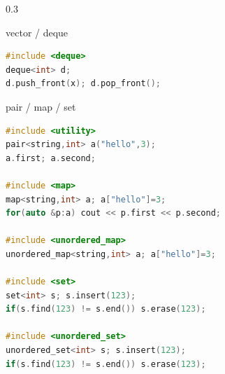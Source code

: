 \documentclass[final]{beamer}
\begin{document}
\begin{frame}[t,fragile]
\begin{columns}[t,totalwidth=0.9\paperwidth, colsep=0.015\paperwidth]
\begin{column}{0.3\paperwidth}
\begin{block}{vector / deque}
\begin{lstlisting}[language=C++]
#include <deque>
deque<int> d;
d.push_front(x); d.pop_front();
\end{lstlisting}
\end{block}

\begin{block}{pair / map / set}
\begin{lstlisting}[language=C++]
#include <utility>
pair<string,int> a("hello",3);
a.first; a.second;

#include <map>
map<string,int> a; a["hello"]=3;
for(auto &p:a) cout << p.first << p.second;

#include <unordered_map>
unordered_map<string,int> a; a["hello"]=3;

#include <set>
set<int> s; s.insert(123);
if(s.find(123) != s.end()) s.erase(123);

#include <unordered_set>
unordered_set<int> s; s.insert(123);
if(s.find(123) != s.end()) s.erase(123);
\end{lstlisting}
\end{block}



\end{column}

\end{columns}
\end{frame}
\end{document}
